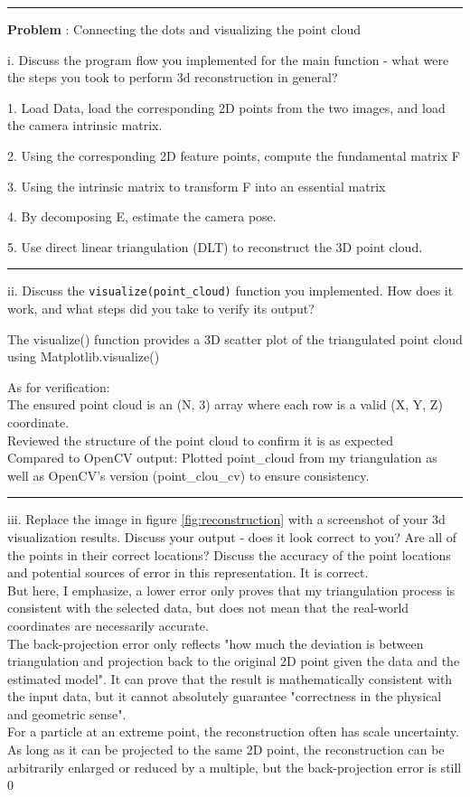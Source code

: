 \documentclass[onecolumn,10pt]{article}
\begin{document}
\hrule
\addtocounter{problemnumber}{1}
\noindent\textbf{Problem }:  Connecting the dots and visualizing the point cloud

i. Discuss the program flow you implemented for the main function - what were the steps you took to perform 3d reconstruction in general?

1. Load Data, load the corresponding 2D points from the two images, and load the camera intrinsic matrix.

2. Using the corresponding 2D feature points, compute the fundamental matrix F

3. Using the intrinsic matrix to transform F into an essential matrix

4. By decomposing E, estimate the camera pose.

5. Use direct linear triangulation (DLT) to reconstruct the 3D point cloud.

\hrule
ii. Discuss the \texttt{visualize(point\_cloud)} function you implemented. How does it work, and what steps did you take to verify its output?

The visualize() function provides a 3D scatter plot of the triangulated point cloud using Matplotlib.visualize()

As for verification:\\
The ensured point cloud is an (N, 3) array where each row is a valid (X, Y, Z) coordinate.\\
Reviewed the structure of the point cloud to confirm it is as expected\\
Compared to OpenCV output: Plotted point\_cloud from my triangulation as well as OpenCV's version (point\_clou\_cv) to ensure consistency.\\

\hrule
iii. Replace the image in figure \ref{fig:reconstruction} with a screenshot of your 3d visualization results. Discuss your output - does it look correct to you? Are all of the points in their correct locations? Discuss the accuracy of the point locations and potential sources of error in this representation.
It is correct.\\
But here, I emphasize, a lower error only proves that my triangulation process is consistent with the selected data, but does not mean that the real-world coordinates are necessarily accurate.\\
The back-projection error only reflects "how much the deviation is between triangulation and projection back to the original 2D point given the data and the estimated model". It can prove that the result is mathematically consistent with the input data, but it cannot absolutely guarantee "correctness in the physical and geometric sense". \\
For a particle at an extreme point, the reconstruction often has scale uncertainty. As long as it can be projected to the same 2D point, the reconstruction can be arbitrarily enlarged or reduced by a multiple, but the back-projection error is still 0\\
\end{document}
